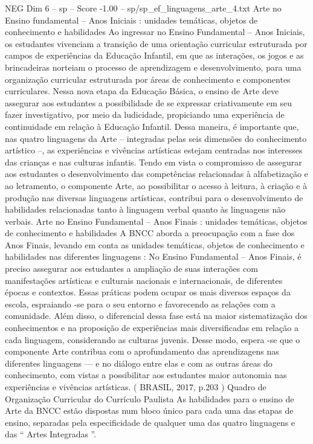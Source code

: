 \begin{textsample}{NEG Dim 6 – sp – Score -1.00 – sp/sp\_ef\_linguagens\_arte\_4.txt}  \label{ex:f6_neg_202}
Arte no Ensino fundamental – Anos Iniciais : unidades temáticas, objetos de conhecimento e habilidades Ao ingressar no Ensino Fundamental – Anos Iniciais, os estudantes vivenciam a transição de uma orientação curricular estruturada por campos de experiências da Educação Infantil, em que as interações, os jogos e as brincadeiras norteiam o processo de aprendizagem e desenvolvimento, para uma organização curricular estruturada por áreas de conhecimento e componentes curriculares.
Nessa nova etapa da Educação Básica, o ensino de Arte deve assegurar aos estudantes a possibilidade de se expressar criativamente em seu fazer investigativo, por meio da ludicidade, propiciando uma experiência de continuidade em relação à Educação Infantil.
Dessa maneira, é importante que, nas quatro linguagens da Arte – integradas pelas seis dimensões do conhecimento artístico –, as experiências e vivências artísticas estejam centradas nos interesses das crianças e nas culturas infantis.
Tendo em vista o compromisso de assegurar aos estudantes o desenvolvimento das competências relacionadas à alfabetização e ao letramento, o componente Arte, ao possibilitar o acesso à leitura, à criação e à produção nas diversas linguagens artísticas, contribui para o desenvolvimento de habilidades relacionadas tanto à linguagem verbal quanto às linguagens não verbais.
Arte no Ensino Fundamental – Anos Finais : unidades temáticas, objetos de conhecimento e habilidades A BNCC aborda a preocupação com a fase dos Anos Finais, levando em conta as unidades temáticas, objetos de conhecimento e habilidades nas diferentes linguagens : No Ensino Fundamental – Anos Finais, é preciso assegurar aos estudantes a ampliação de suas interações com manifestações artísticas e culturais nacionais e internacionais, de diferentes épocas e contextos.
Essas práticas podem ocupar os mais diversos espaços da escola, espraiando -se para o seu entorno e favorecendo as relações com a comunidade.
Além disso, o diferencial dessa fase está na maior sistematização dos conhecimentos e na proposição de experiências mais diversificadas em relação a cada linguagem, considerando as culturas juvenis.
Desse modo, espera -se que o componente Arte contribua com o aprofundamento das aprendizagens nas diferentes linguagens — e no diálogo entre elas e com as outras áreas do conhecimento, com vistas a possibilitar aos estudantes maior autonomia nas experiências e vivências artísticas. ( BRASIL, 2017, p.203 ) Quadro de Organização Curricular do Currículo Paulista As habilidades para o ensino de Arte da BNCC estão dispostas num bloco único para cada uma das etapas de ensino, separadas pela especificidade de qualquer uma das quatro linguagens e das “ Artes Integradas ”.

\end{textsample}
